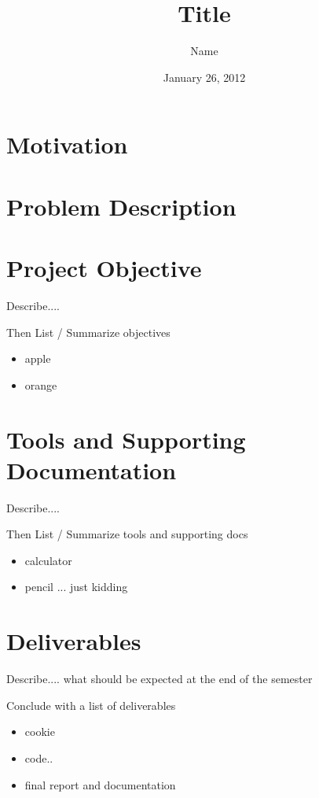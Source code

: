 \documentclass[11pt,twocolumn]{article}
\title{Title}
\author{Name}
\date{January 26, 2012}
\begin{document}
\maketitle						

\section{Motivation}


\section{Problem Description}


\section{Project Objective}

Describe....

Then List / Summarize objectives
\begin{itemize}
	\item apple 
	\item orange
\end{itemize}

\section{Tools and Supporting Documentation}

Describe....

Then List / Summarize tools and supporting docs
\begin{itemize}
	\item calculator
	\item pencil  ... just kidding
\end{itemize}

\section{Deliverables}

Describe.... what should be expected at the end of the semester

Conclude with a list of deliverables

\begin{itemize}
	\item cookie
	\item code..
	\item final report and documentation
\end{itemize}
\end{document}
